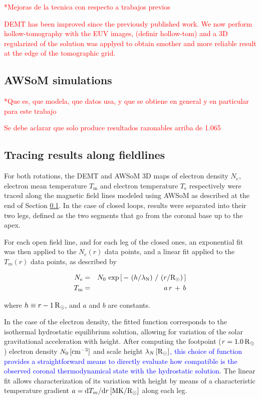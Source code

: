 \documentclass[namedreferences]{solarphysics}
\renewcommand{\l}{\lambda_{\rm N}}%
\newcommand{\mrsun}{{\rm R_\odot}}
\newcommand{\MK}{{\rm MK}}
\newcommand{\cm}{{\rm cm}}
\newcommand{\lN}{\lambda_N}
\begin{document}
\begin{article}
\textcolor{red}{*Mejoras de la tecnica con respecto a trabajos previos}

\textcolor{red}{DEMT has been improved since the previously published work. We now perform hollow-tomography with the EUV images, (definir hollow-tom) and a 3D regularized of the solution was applyed to obtain smother and more reliable result at the edge of the tomographic grid.}

\subsection{AWSoM simulations}\label{awsom} 
\textcolor{red}{*Que es, que modela, que datos usa, y que se obtiene en general y en particular para este trabajo}

\textcolor{red}{Se debe aclarar que solo produce resultados razonables arriba de 1.065}


\subsection{Tracing results along fieldlines}\label{trace} 



For both rotations, the DEMT and AWSoM 3D maps of electron density $N_e$, electron mean temperature $T_\textrm{m}$ and electron temperature $T_\textrm{e}$ respectively were traced along the magnetic field lines modeled using AWSoM as described at the end of Section \ref{awsom}. In the case of closed loops, results were separated into their two legs, defined as the two segments that go from the coronal base up to the apex.

For each open field line, and for each leg of the closed ones, an exponential fit was then applied to the $N_e(r)$ data points, and a linear fit applied to the $T_m(r)$ data points, as described by

\begin{eqnarray}\label{Nfit}
N_e &=& N_0\,\exp{\left[\,-\,\left(h/\l\right)\,/\,\left(r/\mrsun\right)\,\right]}\\
\label{Tfit}
T_\textrm{m} &=& a\,r\,+\,b
\end{eqnarray}
 
\noindent
where $h \equiv r - 1\,\mrsun$, and $a$ and $b$ are constants. 

In the case of the electron density, the fitted function corresponds to the isothermal hydrostatic equilibrium solution, allowing for variation of the solar gravitational acceleration with height. After computing the footpoint ($r=1.0\,\mrsun$) electron density $N_{0}\,[\cm^{-3}]$ and scale height $\lN\,[\mrsun]$\textcolor{blue}{, this choice of function provides a straightforward means to directly evaluate how compatible is the observed coronal thermodynamical state with the hydrostatic solution}. The linear fit allows characterization of its variation with height by means of a characteristic temperature gradient $a = \textrm{d}T_m/\textrm{d}r\,[\MK/\mrsun]$ along each leg.





\end{article}
\end{document}
